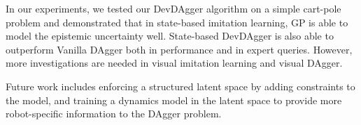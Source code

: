 \documentclass[11pt, reqno, letterpaper, twoside]{amsart}
\begin{document}
In our experiments, we tested our DevDAgger algorithm on a simple cart-pole problem and demonstrated that in state-based imitation learning, GP is able to model the epistemic uncertainty well. State-based DevDAgger is also able to outperform Vanilla DAgger both in performance and in expert queries. However, more investigations are needed in visual imitation learning and visual DAgger.

Future work includes enforcing a structured latent space by adding constraints to the model, and training a dynamics model in the latent space to provide more robot-specific information to the DAgger problem.

	{
		
		
	}
\end{document}
